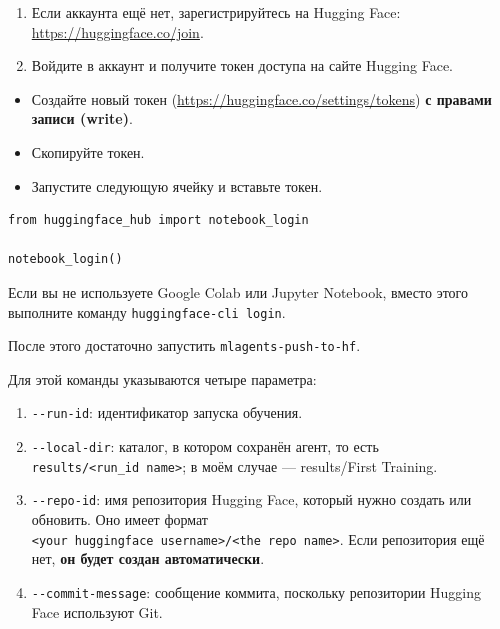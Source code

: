 \documentclass[11pt,a4paper]{article}
\begin{document}
\begin{enumerate}
\def\labelenumi{\arabic{enumi}.}
\item
  Если аккаунта ещё нет, зарегистрируйтесь на Hugging Face: \url{https://huggingface.co/join}.
\item
  Войдите в аккаунт и получите токен доступа на сайте Hugging Face.
\end{enumerate}

\begin{itemize}
\tightlist
\item
  Создайте новый токен (\url{https://huggingface.co/settings/tokens}) \textbf{с правами записи (write)}.
\end{itemize}


\begin{itemize}
\tightlist
\item
  Скопируйте токен.
\item
  Запустите следующую ячейку и вставьте токен.
\end{itemize}

\begin{lstlisting}
from huggingface_hub import notebook_login

notebook_login()
\end{lstlisting}

Если вы не используете Google Colab или Jupyter Notebook, вместо этого выполните команду \texttt{huggingface-cli\ login}.

После этого достаточно запустить \texttt{mlagents-push-to-hf}.


Для этой команды указываются четыре параметра:

\begin{enumerate}
\def\labelenumi{\arabic{enumi}.}
\tightlist
\item
  \texttt{-\/-run-id}: идентификатор запуска обучения.
\item
  \texttt{-\/-local-dir}: каталог, в котором сохранён агент, то есть \texttt{results/\textless{}run\_id\ name\textgreater{}}; в моём случае --- results/First Training.
\item
  \texttt{-\/-repo-id}: имя репозитория Hugging Face, который нужно создать или обновить. Оно имеет формат \texttt{\textless{}your\ huggingface\ username\textgreater{}/\textless{}the\ repo\ name\textgreater{}}. Если репозитория ещё нет, \textbf{он будет создан автоматически}.
\item
  \texttt{-\/-commit-message}: сообщение коммита, поскольку репозитории Hugging Face используют Git.
\end{enumerate}
\end{document}
